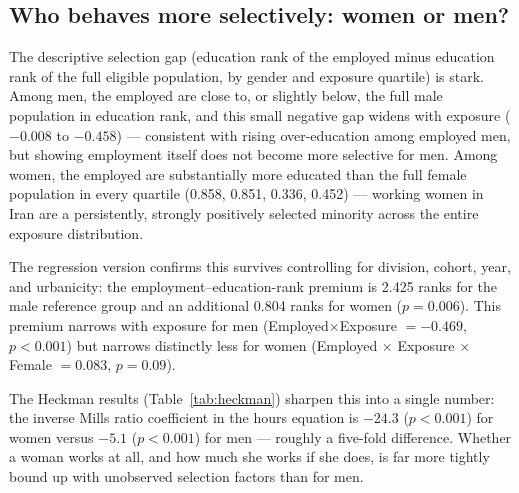 \documentclass[11pt]{article}
\begin{document}
\subsection{Who behaves more selectively: women or men?}

The descriptive selection gap (education rank of the employed minus education rank of the full eligible population, by gender and exposure quartile) is stark. Among men, the employed are close to, or slightly below, the full male population in education rank, and this small negative gap widens with exposure ($-0.008$ to $-0.458$) --- consistent with rising over-education among employed men, but showing employment itself does not become more selective for men. Among women, the employed are substantially more educated than the full female population in every quartile (0.858, 0.851, 0.336, 0.452) --- working women in Iran are a persistently, strongly positively selected minority across the entire exposure distribution.

The regression version confirms this survives controlling for division, cohort, year, and urbanicity: the employment--education-rank premium is 2.425 ranks for the male reference group and an additional 0.804 ranks for women ($p=0.006$). This premium narrows with exposure for men (Employed$\times$Exposure $=-0.469$, $p<0.001$) but narrows distinctly less for women (Employed $\times$ Exposure $\times$ Female $=0.083$, $p=0.09$).

The Heckman results (Table~\ref{tab:heckman}) sharpen this into a single number: the inverse Mills ratio coefficient in the hours equation is $-24.3$ ($p<0.001$) for women versus $-5.1$ ($p<0.001$) for men --- roughly a five-fold difference. Whether a woman works at all, and how much she works if she does, is far more tightly bound up with unobserved selection factors than for men.
\end{document}
